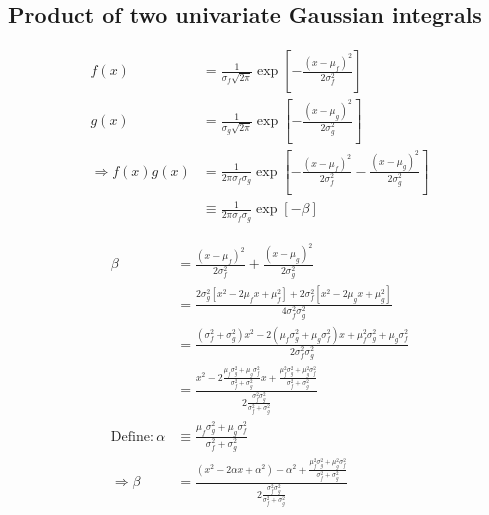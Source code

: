 \documentclass[/home/jesse/Analysis/FemtoAnalysis/AnalysisNotes/AnalysisNoteJBuxton.tex]{subfiles}
\begin{document}


\subsection{Product of two univariate Gaussian integrals}
\label{app:ProdTwoGauss}

\begin{equation}
\begin{aligned}
f(x) &= \frac{1}{\sigma_{f}\sqrt{2\pi}}\exp \left[ -\frac{(x-\mu_{f})^{2}}{2\sigma_{f}^{2}} \right] \\
g(x) &= \frac{1}{\sigma_{g}\sqrt{2\pi}}\exp \left[ -\frac{(x-\mu_{g})^{2}}{2\sigma_{g}^{2}} \right] \\
\Rightarrow f(x)g(x) &= \frac{1}{2\pi\sigma_{f}\sigma_{g}}\exp \left[ -\frac{(x-\mu_{f})^{2}}{2\sigma_{f}^{2}} -\frac{(x-\mu_{g})^{2}}{2\sigma_{g}^{2}} \right] \\
&\equiv \frac{1}{2\pi\sigma_{f}\sigma_{g}}\exp[-\beta]
\end{aligned}
\label{eqn:ProdGauss1}
\end{equation}

\vspace{10mm}

\begin{equation}
\begin{aligned}
\beta &= \frac{(x-\mu_{f})^{2}}{2\sigma_{f}^{2}} + \frac{(x-\mu_{g})^{2}}{2\sigma_{g}^{2}} \\
&= \frac{2\sigma_{g}^{2}[x^{2} - 2\mu_{f}x + \mu_{f}^{2}] + 2\sigma_{f}^{2}[x^{2} - 2\mu_{g}x + \mu_{g}^{2}]}{4\sigma_{f}^{2}\sigma_{g}^{2}} \\
&= \frac{(\sigma_{f}^{2} + \sigma_{g}^{2})x^{2} - 2(\mu_{f}\sigma_{g}^{2} + \mu_{g}\sigma_{f}^{2})x + \mu_{f}^{2}\sigma_{g}^{2} + \mu_{g}\sigma_{f}^{2}}{2\sigma_{f}^{2}\sigma_{g}^{2}} \\
&= \frac{x^{2} - 2\frac{\mu_{f}\sigma_{g}^{2} + \mu_{g}\sigma_{f}^{2}}{\sigma_{f}^{2} + \sigma_{g}^{2}}x + \frac{\mu_{f}^{2}\sigma_{g}^{2} + \mu_{g}^{2}\sigma_{f}^{2}}{\sigma_{f}^{2} + \sigma_{g}^{2}}}{2\frac{\sigma_{f}^{2}\sigma_{g}^{2}}{\sigma_{f}^{2} + \sigma_{g}^{2}}} \\
\mathrm{Define} : \alpha &\equiv \frac{\mu_{f}\sigma_{g}^{2} + \mu_{g}\sigma_{f}^{2}}{\sigma_{f}^{2} + \sigma_{g}^{2}} \\
\Rightarrow \beta &= \frac{(x^{2} - 2\alpha x + \alpha^{2}) - \alpha^{2} + \frac{\mu_{f}^{2}\sigma_{g}^{2} + \mu_{g}^{2}\sigma_{f}^{2}}{\sigma_{f}^{2} + \sigma_{g}^{2}}}{2 \frac{\sigma_{f}^{2}\sigma_{g}^{2}}{\sigma_{f}^{2} + \sigma_{g}^{2}}}
\end{aligned}
\label{eqn:ProdGauss2}
\end{equation}
\end{document}
